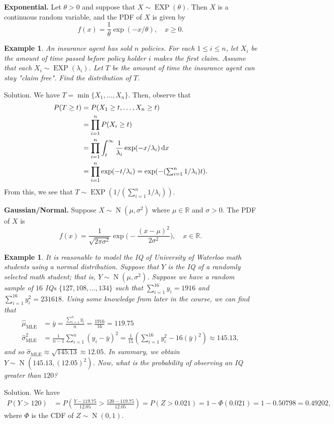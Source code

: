 \documentclass[10pt]{article}
\newcommand{\R}{\mathbb{R}}
\DeclareMathOperator{\EXP}{EXP}
\DeclareMathOperator{\Nor}{N}
\DeclareMathOperator{\MLE}{MLE}
\theoremstyle{newstyle}
\newtheorem{exmp}[thm]{Example}
\begin{document}
{\bf Exponential.} Let $\theta > 0$ and suppose that $X \sim \EXP(\theta)$. Then 
$X$ is a continuous random variable, and the PDF of $X$ is given by 
\[ f(x) = \frac{1}\theta \exp(-x/\theta), \quad x \geq 0. \]

\begin{exmp}
An insurance agent has sold $n$ policies. For each $1 \leq i \leq n$, let $X_i$ be the amount 
of time passed before policy holder $i$ makes the first claim. Assume that each
$X_i \sim \EXP(\lambda_i)$. Let $T$ be the amount of time the insurance agent can stay 
"claim free". Find the distribution of $T$.
\end{exmp}
{\sc Solution.} We have $T = \min\{X_1, \dots, X_n\}$. Then, observe that
\begin{align*}
    P(T \geq t) &= P(X_1 \geq t, \dots, X_n \geq t) \\
    &= \prod_{i=1}^n P(X_i \geq t) \\
    &= \prod_{i=1}^n \int_t^\infty \frac{1}{\lambda_i} \exp(-x/\lambda_i)\,{\rm d}x \\
    &= \prod_{i=1}^n \exp(-t/\lambda_i) = \exp(-(\textstyle\sum_{i=1}^n 1/\lambda_i)t). 
\end{align*}
From this, we see that $T \sim \EXP(1/(\sum_{i=1}^n 1/\lambda_i))$.

{\bf Gaussian/Normal.} Suppose $X \sim \Nor(\mu, \sigma^2)$ where $\mu \in \R$ and $\sigma > 0$. 
The PDF of $X$ is 
\[ f(x) = \frac{1}{\sqrt{2\pi\sigma^2}} \exp \Big(-\frac{(x-\mu)^2}{2\sigma^2} \Big), 
\quad x \in \R. \]

\begin{exmp}
It is reasonable to model the IQ of University of Waterloo math students using a normal distribution.
Suppose that $Y$ is the IQ of a randomly selected math student; that is, $Y \sim \Nor(\mu, \sigma^2)$.
Suppose we have a random sample of $16$ IQs $\{127, 108, \dots, 134\}$ such that 
$\sum_{i=1}^{16} y_i = 1916$ and $\sum_{i=1}^{16} y_i^2 = 231618$. Using some 
knowledge from later in the course, we can find that 
\begin{align*}
    \widehat{\mu}_{\MLE} &= \bar{y} = \frac{\sum_{i=1}^n y_i}{n} = \frac{1916}{16} = 119.75 \\
    \widehat{\sigma}^2_{\MLE} &= \frac{1}{n-1} \sum_{i=1}^n (y_i - \bar{y})^2 
    = \frac{1}{15} \left( \sum_{i=1}^{16} y_i^2 - 16(\bar{y})^2 \right) \approx 145.13,
\end{align*}  
and so $\widehat{\sigma}_{\MLE} \approx \sqrt{145.13} \approx 12.05$. In summary, we obtain 
$Y \sim \Nor(145.13, (12.05)^2)$. Now, what is the probability of observing an IQ greater than $120$?
\end{exmp}
{\sc Solution.} We have 
\begin{align*}
    P(Y > 120) &= P \left( \frac{Y-119.75}{12.05} > \frac{120-119.75}{12.05} \right) 
    = P(Z > 0.021) = 1 - \Phi(0.021) = 1 - 0.50798 = 0.49202, 
\end{align*}
where $\Phi$ is the CDF of $Z \sim \Nor(0, 1)$.
\end{document}
